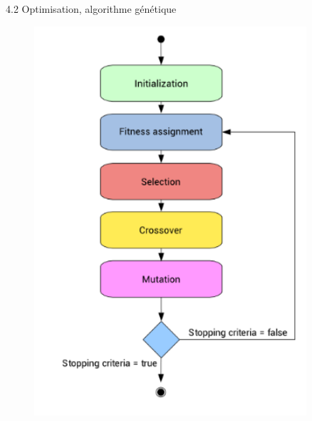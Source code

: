 \begin{frame}{4.2 Optimisation, algorithme génétique}
\begin{minipage}{.3\textwidth}
\begin{figure}
      \includegraphics[width=0.9\textwidth]{figs/genAlg_desc.png}
    \end{figure}
  \end{minipage}
\end{frame}

